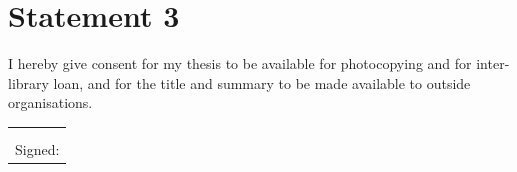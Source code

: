 \documentclass[11pt, a4paper, twoside, openright]{book}
\newcommand{\thesisdate}{\formatdate{1}{6}{2015}}
\begin{document}
\section*{Statement 3}

I hereby give consent for my thesis to be available for
photocopying and for inter-library loan, and for the title and summary
to be made available to outside organisations.

\vspace{0.5cm}
\begin{tabular}{l}
\thesisdate \\
\\
Signed:
\end{tabular}

\clearpage
\thispagestyle{empty}
\mbox{}

\newpage
\dominitoc
\tableofcontents


\clearpage





































\end{document}
